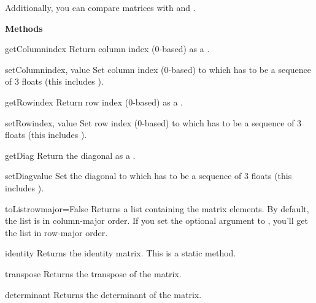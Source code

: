 Additionally, you can compare matrices with \code{==} and \code{!=}.

{\bf Methods}

\begin{methoddesc}{getColumn}{index}
Return column index (0-based) as a .
\end{methoddesc}

\begin{methoddesc}{setColumn}{index, value}
Set column index (0-based) to  which has to be a sequence
of 3 floats (this includes ).
\end{methoddesc}

\begin{methoddesc}{getRow}{index}
Return row index (0-based) as a .
\end{methoddesc}

\begin{methoddesc}{setRow}{index, value}
Set row index (0-based) to  which has to be a sequence of
3 floats (this includes ).
\end{methoddesc}

\begin{methoddesc}{getDiag}{}
Return the diagonal as a .
\end{methoddesc}

\begin{methoddesc}{setDiag}{value}
Set the diagonal to  which has to be a sequence of
3 floats (this includes ).
\end{methoddesc}

\begin{methoddesc}{toList}{rowmajor=False}
Returns a list containing the matrix elements. By default, the list is
in column-major order. If you set the optional argument  to
, you'll get the list in row-major order.
\end{methoddesc}

\begin{methoddesc}{identity}{}
Returns the identity matrix. This is a static method.
\end{methoddesc}

\begin{methoddesc}{transpose}{}
Returns the transpose of the matrix.
\end{methoddesc}

\begin{methoddesc}{determinant}{}
Returns the determinant of the matrix.
\end{methoddesc}

